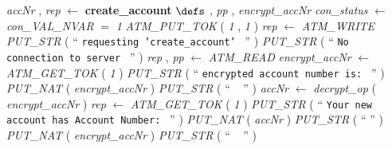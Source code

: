 \begin{tabbing}
\bSetTabs
\+\>
%
%
{\em accNr\/} , {\em rep\/} $\longleftarrow$  {\bf { create\_account}}  \bhsp $\defs$ \+ \bnl
\bnl
{} \+\bnl
{}  , {\em pp\/} , {\em encrypt\_accNr\/} \- \bhsp {} \+\bnl
{\em con\_status\/} $\longleftarrow$ {\em con\_VAL\_NVAR\/}\label{con_VAL_NVAR}  \bStatementSemiColon \bnl
{}  $=$ {\em 1\/} \- \bhsp {} \+\bnl
{\em ATM\_PUT\_TOK\/}\label{ATM_PUT_TOK}  ( {\em 1\/} , {\em 1\/} )  \bStatementSemiColon \bnl
{\em rep\/} $\longleftarrow$ {\em ATM\_WRITE\/}\label{ATM_WRITE}  \bStatementSemiColon \bnl
{\em PUT\_STR\/}\label{PUT_STR}  (  `` {\tt requesting 'create\_account'
} ''  )  \-\bnl
{} \+\bnl
{\em PUT\_STR\/}\label{PUT_STR}  (  `` {\tt No connection to server
} ''  )  \-\bnl
{}  \bStatementSemiColon \bnl
{\em rep\/} , {\em pp\/} $\longleftarrow$ {\em ATM\_READ\/}\label{ATM_READ}  \bStatementSemiColon \bnl
{\em encrypt\_accNr\/} $\longleftarrow$ {\em ATM\_GET\_TOK\/}\label{ATM_GET_TOK}  ( {\em 1\/} )  \bStatementSemiColon \bnl
{\em PUT\_STR\/}\label{PUT_STR}  (  `` {\tt encrypted account number is:
} ''  )  \bStatementSemiColon \bnl
{\em PUT\_NAT\/}\label{PUT_NAT}  ( {\em encrypt\_accNr\/} )  \bStatementSemiColon \bnl
{\em PUT\_STR\/}\label{PUT_STR}  (  `` {\tt
} ''  )  \bStatementSemiColon \bnl
{\em accNr\/} $\longleftarrow$ {\em decrypt\_op\/}\label{decrypt_op}  ( {\em encrypt\_accNr\/} )  \bStatementSemiColon \bnl
{\em rep\/} $\longleftarrow$ {\em ATM\_GET\_TOK\/}\label{ATM_GET_TOK}  ( {\em 1\/} )  \bStatementSemiColon \bnl
{\em PUT\_STR\/}\label{PUT_STR}  (  `` {\tt Your new account has Account Number: } ''  )  \bStatementSemiColon \bnl
{\em PUT\_NAT\/}\label{PUT_NAT}  ( {\em accNr\/} )  \bStatementSemiColon \bnl
{\em PUT\_STR\/}\label{PUT_STR}  (  `` {\tt  } ''  )  \bStatementSemiColon \bnl
{\em PUT\_NAT\/}\label{PUT_NAT}  ( {\em encrypt\_accNr\/} )  \bStatementSemiColon \bnl
{\em PUT\_STR\/}\label{PUT_STR}  (  `` {\tt
} ''  )  \-\bnl
{}  \-\bnl
{}  \- \bOperationSemiColon 
\end{tabbing}
\bresetindent
%

